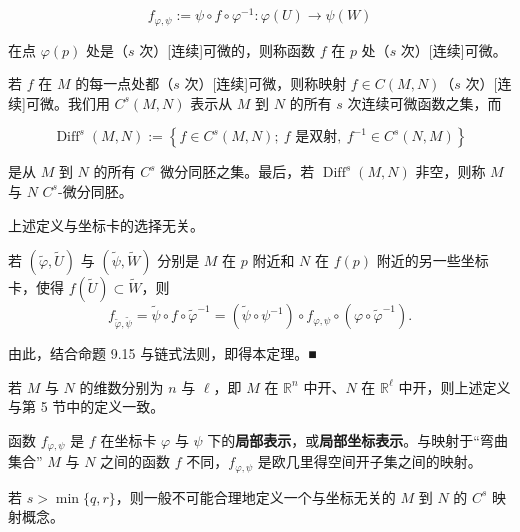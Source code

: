 \[
f_{\varphi,\psi} := \psi\circ f\circ\varphi^{-1} : \varphi(U) \to \psi(W)
\]

在点 $ \varphi(p) $ 处是（$ s $ 次）[连续]可微的，则称函数 $ f $ 在 $ p $ 处（$ s $ 次）[连续]可微。

若 $ f $ 在 $ M $ 的每一点处都（$ s $ 次）[连续]可微，则称映射 $ f \in C(M,N) $（$ s $ 次）[连续]可微。我们用 $ C^{s}(M,N) $ 表示从 $ M $ 到 $ N $ 的所有 $ s $ 次连续可微函数之集，而

\[
\operatorname{Diff}^{s}(M,N) := \left\{ f \in C^{s}(M,N) ;\ f \text{ 是双射},\ f^{-1} \in C^{s}(N,M) \right\}
\]

是从 $ M $ 到 $ N $ 的所有 $ C^{s} $ 微分同胚之集。最后，若 $ \operatorname{Diff}^{s}(M,N) $ 非空，则称 $ M $ 与 $ N $ $ C^{s} $-微分同胚。

\begin{remark}

\begin{items}
\item

上述定义与坐标卡的选择无关。

\proofhead
若 $ (\tilde{\varphi},\tilde{U}) $ 与 $ (\tilde{\psi},\tilde{W}) $ 分别是 $ M $ 在 $ p $ 附近和 $ N $ 在 $ f(p) $ 附近的另一些坐标卡，使得 $ f(\tilde{U}) \subset \tilde{W} $，则
\begin{equation}
f_{\tilde{\varphi},\tilde{\psi}} = \tilde{\psi}\circ f\circ\tilde{\varphi}^{-1} = (\tilde{\psi}\circ\psi^{-1})\circ f_{\varphi,\psi}\circ(\varphi\circ\tilde{\varphi}^{-1}) .\tag{10.3}
\end{equation}

由此，结合命题 9.15 与链式法则，即得本定理。\nobreak\hspace{0.35em}■

\item

若 $ M $ 与 $ N $ 的维数分别为 $ n $ 与 $ \ell $，即 $ M $ 在 $ \mathbb{R}^{n} $ 中开、$ N $ 在 $ \mathbb{R}^{\ell} $ 中开，则上述定义与第 5 节中的定义一致。

\item

函数 $ f_{\varphi,\psi} $ 是 $ f $ 在坐标卡 $ \varphi $ 与 $ \psi $ 下的\textbf{局部表示}，或\textbf{局部坐标表示}。与映射于“弯曲集合” $ M $ 与 $ N $ 之间的函数 $ f $ 不同，$ f_{\varphi,\psi} $ 是欧几里得空间开子集之间的映射。

\item

若 $ s > \min\{q,r\} $，则一般不可能合理地定义一个与坐标无关的 $ M $ 到 $ N $ 的 $ C^{s} $ 映射概念。


\end{items}
\end{remark}
